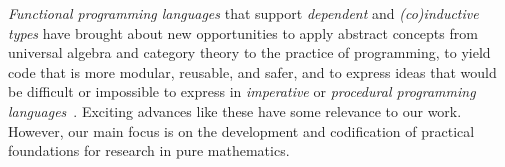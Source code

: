 \documentclass[11pt]{amsart}  %
\begin{document}

\emph{Functional programming languages} that support \emph{dependent} and \emph{(co)inductive types} have brought about new opportunities to apply abstract concepts from universal algebra and category theory to the practice of programming, to yield code that is more modular, reusable, and safer, and to express ideas that would be difficult or impossible to express in \emph{imperative} or \emph{procedural programming languages}~\cite[Chs. 5 \& 10]{baueroplss:2018,hughes:1989,chiusano:2014}. Exciting advances like these have some relevance to our work.  However, our main focus is on the development and codification of practical foundations for research in pure mathematics.
 
\end{document}
